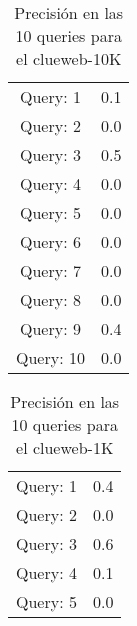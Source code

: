\begin{table}
\centering
\begin{tabular}{cc}
Query: 1&0.1
\\
Query: 2&0.0
\\
Query: 3&0.5
\\
Query: 4&0.0
\\
Query: 5&0.0
\\
Query: 6&0.0
\\
Query: 7&0.0
\\
Query: 8&0.0
\\
Query: 9&0.4
\\
Query: 10&0.0
\\
\end{tabular}
\caption{Precisi\'{o}n en las 10 queries para el clueweb-10K}
\end{table}
\begin{table}
\centering
\begin{tabular}{cc}
Query: 1&0.4
\\
Query: 2&0.0
\\
Query: 3&0.6
\\
Query: 4&0.1
\\
Query: 5&0.0
\\
\end{tabular}
\caption{Precisi\'{o}n en las 10 queries para el clueweb-1K}
\end{table}
